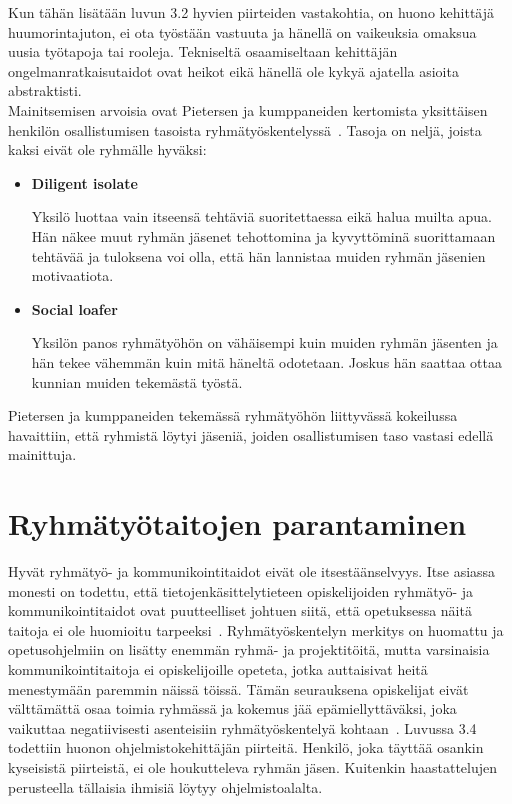 \documentclass[finnish]{../tktltiki2}
\theoremstyle{definition}
\theoremstyle{remark}
\begin{document}
Kun tähän lisätään luvun 3.2 hyvien piirteiden vastakohtia, on huono kehittäjä huumorintajuton, ei ota työstään vastuuta ja hänellä on vaikeuksia omaksua uusia työtapoja tai rooleja. Tekniseltä osaamiseltaan kehittäjän ongelmanratkaisutaidot ovat heikot eikä hänellä ole kykyä ajatella asioita abstraktisti.\\

Mainitsemisen arvoisia ovat Pietersen ja kumppaneiden kertomista yksittäisen henkilön osallistumisen tasoista ryhmätyös\-kentelyssä~\cite{Pieterse:2012:PPS:2157136.2157218}. Tasoja on neljä, joista
kaksi eivät ole ryhmälle hyväksi:

\begin{itemize}

\item {\bf Diligent isolate}

Yksilö luottaa vain itseensä tehtäviä suoritettaessa eikä halua muilta apua. Hän näkee
muut ryhmän jäsenet tehottomina ja kyvyttöminä suorittamaan tehtävää ja tuloksena voi olla, että
hän lannistaa muiden ryhmän jäsenien motivaatiota.

\item {\bf Social loafer}

Yksilön panos ryhmätyöhön on vähäisempi kuin muiden ryhmän jäsenten ja hän
tekee vähemmän kuin mitä häneltä odotetaan. Joskus hän saattaa ottaa kunnian muiden
tekemästä työstä.

\end{itemize}

Pietersen ja kumppaneiden tekemässä ryhmätyöhön liittyvässä kokeilussa havaittiin, että ryhmistä löytyi jäseniä, joiden osallistumisen taso vastasi edellä mainittuja.

\section{Ryhmätyötaitojen parantaminen}

Hyvät ryhmätyö- ja kommunikointitaidot eivät ole itsestäänselvyys. Itse asiassa monesti on todettu, että
tietojenkäsittelytieteen opiskelijoiden ryhmätyö- ja kommunikointitaidot ovat puutteelliset johtuen siitä, että opetuksessa näitä taitoja ei ole huomioitu tarpeeksi~\cite{Cushing:2003:TBP:948785.948797,5593527,Waite:2004:SCV:1028174.971308}. Ryhmätyöskentelyn merkitys on huomattu ja
opetusohjelmiin on lisätty enemmän ryhmä- ja projektitöitä, mutta varsinaisia kommunikointitaitoja ei opiskelijoille opeteta, jotka auttaisivat
heitä menestymään paremmin näissä töissä. Tämän seurauksena opiskelijat eivät välttämättä osaa toimia ryhmässä ja kokemus jää epämiellyttäväksi, joka vaikuttaa negatiivisesti asenteisiin ryhmätyöskentelyä kohtaan~\cite{1158709}.
Luvussa 3.4 todettiin huonon ohjelmistokehittäjän piirteitä. Henkilö, joka täyttää osankin kyseisistä piirteistä, ei ole houkutteleva ryhmän jäsen. Kuitenkin haastattelujen perusteella tällaisia ihmisiä löytyy ohjelmistoalalta.\\
\end{document}
